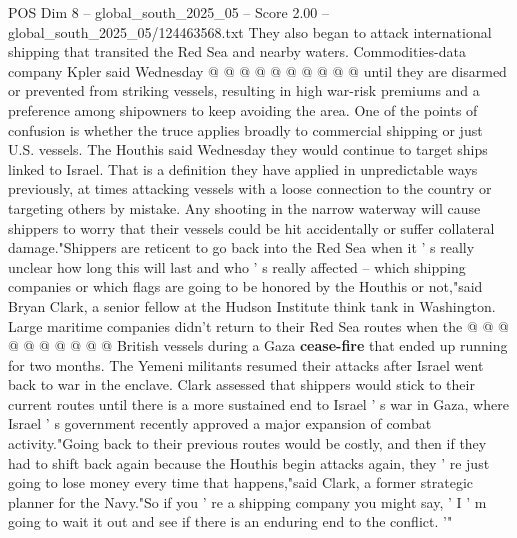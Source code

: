 \begin{textsample}{POS Dim 8 – global\_south\_2025\_05 – Score 2.00 – global\_south\_2025\_05/124463568.txt}
They also began to attack international shipping that transited the Red Sea and nearby waters.
Commodities-data company Kpler said Wednesday @ @ @ @ @ @ @ @ @ @ until they are disarmed or prevented from striking vessels, resulting in high war-risk premiums and a preference among shipowners to keep avoiding the area.
One of the points of confusion is whether the truce applies broadly to commercial shipping or just U.S. vessels.
The Houthis said Wednesday they would continue to target ships linked to Israel.
That is a definition they have applied in unpredictable ways previously, at times attacking vessels with a loose connection to the country or targeting others by mistake.
Any shooting in the narrow waterway will cause shippers to worry that their vessels could be hit accidentally or suffer collateral damage."Shippers are reticent to go back into the Red Sea when it ' s really unclear how long this will last and who ' s really affected -- which shipping companies or which flags are going to be honored by the Houthis or not,"said Bryan Clark, a senior fellow at the Hudson Institute think tank in Washington.
Large maritime companies didn't return to their Red Sea routes when the @ @ @ @ @ @ @ @ @ @ British vessels during a Gaza \textbf{cease-fire} that ended up running for two months.
The Yemeni militants resumed their attacks after Israel went back to war in the enclave.
Clark assessed that shippers would stick to their current routes until there is a more sustained end to Israel ' s war in Gaza, where Israel ' s government recently approved a major expansion of combat activity."Going back to their previous routes would be costly, and then if they had to shift back again because the Houthis begin attacks again, they ' re just going to lose money every time that happens,"said Clark, a former strategic planner for the Navy."So if you ' re a shipping company you might say, ' I ' m going to wait it out and see if there is an enduring end to the conflict. '"

\end{textsample}
